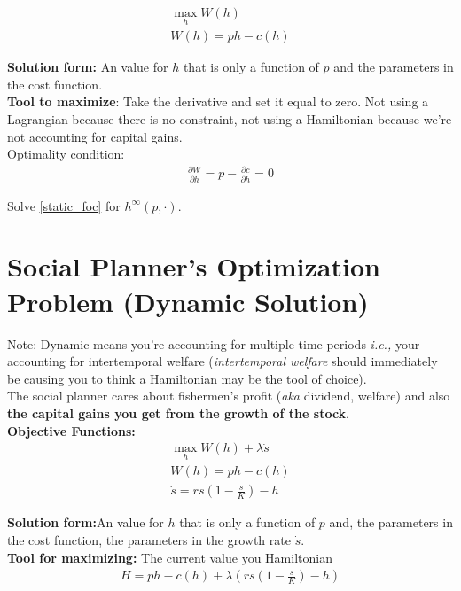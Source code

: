 \documentclass[12pt]{article}
\begin{document}
\begin{align}
    \max_h W(h)\\
    W(h)= ph -c(h)
\end{align}

\textbf{Solution form:} An value for $h$ that is only a function of $p$ and the parameters in the cost function. \\

\textbf{Tool to maximize}: Take the derivative and set it equal to zero. Not using a Lagrangian because there is no constraint, not using a Hamiltonian because we're not accounting for capital gains. \\

Optimality condition: 
\begin{align}
    \frac{\partial W}{\partial h} = p - \frac{\partial c}{\partial h} = 0 \label{static_foc}
\end{align}

Solve \ref{static_foc} for $h^\infty(p, \cdot)$.

\section{Social Planner's Optimization Problem (Dynamic Solution)}
Note: Dynamic means you're accounting for multiple time periods \textit{i.e.,} your accounting for intertemporal welfare (\textit{intertemporal welfare} should immediately be causing you to think a Hamiltonian may be the tool of choice). \\

The social planner cares about fishermen's profit (\textit{aka} dividend, welfare) and also \textbf{the capital gains you get from the growth of the stock}. \\

\textbf{Objective Functions:}
\begin{align}
    \max_h W(h) + \lambda \dot s \\
    W(h)= ph -c(h)\\
    \dot s = rs(1 - \frac{s}{K}) - h
\end{align}

\textbf{Solution form:}An value for $h$ that is only a function of $p$ and, the parameters in the cost function, the parameters in the growth rate $\dot s$.\\

\textbf{Tool for maximizing:} The current value you Hamiltonian 
\begin{align}
    H = ph -c(h) + \lambda (rs(1 - \frac{s}{K}) - h)
\end{align}
\end{document}
